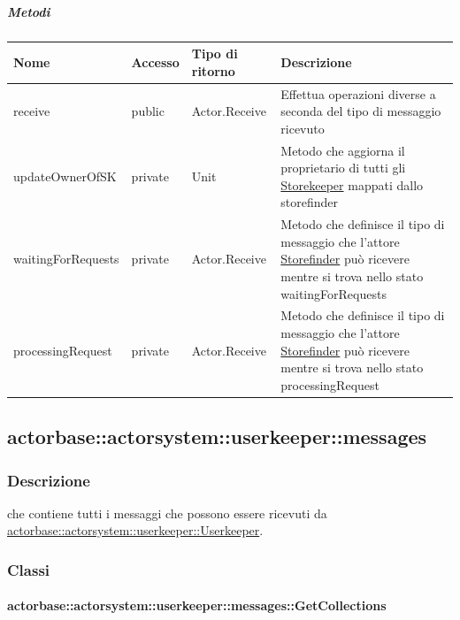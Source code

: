\documentclass{scalatekids-article}
\begin{document}
\subparagraph{Metodi}
\begin{tabular}{| l | l | l | l |}
  \hline
  Nome & Accesso & Tipo di ritorno & Descrizione\\
  \hline
  receive & public & Actor.Receive  & Effettua operazioni diverse a seconda del tipo di messaggio ricevuto\\
  \hline
  updateOwnerOfSK & private &  Unit & Metodo che aggiorna il proprietario di tutti gli \hyperref[sec:actorbase::actorsystem::storekeeper::Storekeeper]{Storekeeper} mappati dallo storefinder\\
  \hline
  waitingForRequests & private & Actor.Receive & Metodo che definisce il tipo di messaggio che l'attore \hyperref[sec:actorbase::actorsystem::storefinder::Storefinder]{Storefinder} può ricevere mentre si trova nello stato waitingForRequests\\
  \hline
  processingRequest & private & Actor.Receive & Metodo che definisce il tipo di messaggio che l'attore \hyperref[sec:actorbase::actorsystem::main::storefinder::Storefinder]{Storefinder} può ricevere mentre si trova nello stato processingRequest\\
  \hline
\end{tabular}

\subsection{actorbase::actorsystem::userkeeper::messages}
\label{sec:actorbase::actorsystem::userkeeper::messages}

\subsubsection{Descrizione}

 che contiene tutti i messaggi che possono essere ricevuti da
\hyperref[sec:actorbase::actorsystem::userkeeper::Userkeeper]{actorbase::actorsystem::userkeeper::Userkeeper}.

\subsubsection{Classi}

\paragraph{actorbase::actorsystem::userkeeper::messages::GetCollections}
\label{sec:actorbase::actorsystem::userkeeper::messages::GetCollections}
\end{document}
